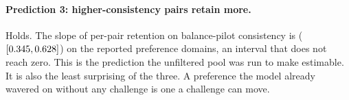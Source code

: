 \paragraph{Prediction 3: higher-consistency pairs retain more.} Holds. The slope of
per-pair retention on balance-pilot consistency is \pqxeSlope{}
(\([\num{0.345}{}, \num{0.628}{}]\)) on the reported preference domains, an interval
that does not reach zero. This is the prediction the unfiltered pool was run to make
estimable. It is also the least surprising of the three. A preference the model already
wavered on without any challenge is one a challenge can move.

